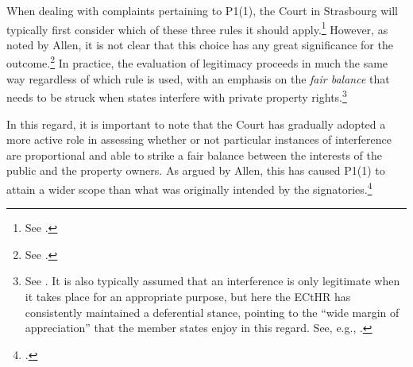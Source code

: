 When dealing with complaints pertaining to P1(1), the Court in Strasbourg will typically first consider which of these three rules it should apply.\footnote{See \cite[102-104]{allen05}.} However, as noted by Allen, it is not clear that this choice has any great significance for the outcome.\footnote{See \cite[104-105]{allen05}.} In practice, the evaluation of legitimacy proceeds in much the same way regardless of which rule is used, with an emphasis on the {\it fair balance} that needs to be struck when states interfere with private property rights.\footnote{See \cite[[103]{allen05}. It is also typically assumed that an interference is only legitimate when it takes place for an appropriate purpose, but here the ECtHR has consistently maintained a deferential stance, pointing to the ``wide margin of appreciation'' that the member states enjoy in this regard. See, e.g., \cite[54]{james86}.} 




In this regard, it is important to note that the Court has gradually adopted a more active role in assessing whether or not particular instances of interference are proportional and able to strike a fair balance between the interests of the public and the property owners. As argued by Allen, this has caused P1(1) to attain a wider scope than what was originally intended by the signatories.\footcite[1055]{allen10}


